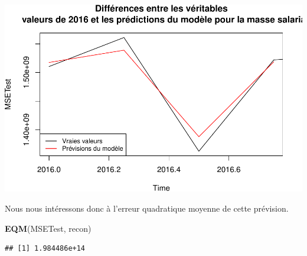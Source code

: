\documentclass[11pt,]{article}
\newenvironment{Shaded}{\begin{snugshade}}{\end{snugshade}}
\newcommand{\KeywordTok}[1]{\textcolor[rgb]{0.13,0.29,0.53}{\textbf{{#1}}}}
\newcommand{\NormalTok}[1]{{#1}}
\begin{document}
\includegraphics{doc_files/figure-latex/unnamed-chunk-14-1.pdf}

Nous nous intéressons donc à l'erreur quadratique moyenne de cette
prévision.

\begin{Shaded}
\begin{Highlighting}[]
\KeywordTok{EQM}\NormalTok{(MSETest, recon)}
\end{Highlighting}
\end{Shaded}

\begin{verbatim}
## [1] 1.984486e+14
\end{verbatim}
\end{document}
